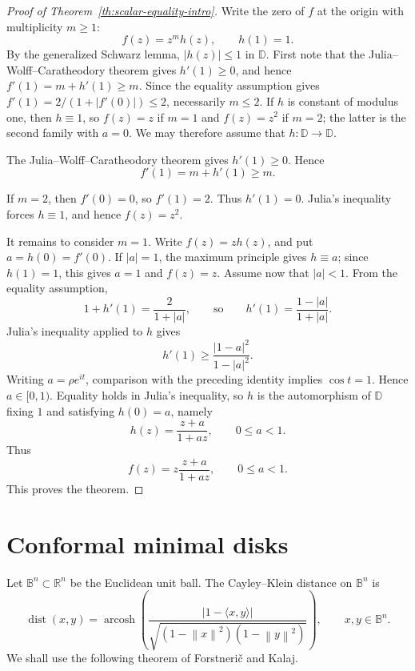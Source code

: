 \documentclass[11pt]{amsart}
\theoremstyle{definition}
\theoremstyle{remark}
\newcommand{\R}{\mathbb R}
\newcommand{\D}{\mathbb D}
\newcommand{\B}{\mathbb B}
\newcommand{\inner}[2]{\langle #1,#2\rangle}
\newcommand{\norm}[1]{\left\|#1\right\|}
\newcommand{\dist}{\operatorname{dist}}
\newcommand{\arcosh}{\operatorname{arcosh}}
\begin{document}
\begin{proof}[Proof of Theorem~\ref{th:scalar-equality-intro}]
Write the zero of \(f\) at the origin with multiplicity \(m\ge1\):
\[
        f(z)=z^m h(z),
        \qquad h(1)=1.
\]
By the generalized Schwarz lemma, \(|h(z)|\le1\) in \(\D\). First note that the Julia--Wolff--Caratheodory theorem gives \(h'(1)\ge0\), and hence \(f'(1)=m+h'(1)\ge m\). Since the equality assumption gives \(f'(1)=2/(1+|f'(0)|)\le2\), necessarily \(m\le2\). If \(h\) is constant of modulus one, then \(h\equiv1\), so \(f(z)=z\) if \(m=1\) and \(f(z)=z^2\) if \(m=2\); the latter is the second family with \(a=0\). We may therefore assume that \(h:\D\to\D\).

The Julia--Wolff--Caratheodory theorem gives \(h'(1)\ge0\). Hence
\[
        f'(1)=m+h'(1)\ge m.
\]

If \(m=2\), then \(f'(0)=0\), so \(f'(1)=2\). Thus \(h'(1)=0\). Julia's inequality forces \(h\equiv1\), and hence \(f(z)=z^2\).

It remains to consider \(m=1\). Write \(f(z)=zh(z)\), and put \(a=h(0)=f'(0)\). If \(|a|=1\), the maximum principle gives \(h\equiv a\); since \(h(1)=1\), this gives \(a=1\) and \(f(z)=z\). Assume now that \(|a|<1\). From the equality assumption,
\[
        1+h'(1)=\frac{2}{1+|a|},
        \qquad\text{so}\qquad
        h'(1)=\frac{1-|a|}{1+|a|}.
\]
Julia's inequality applied to \(h\) gives
\[
        h'(1)
        \ge
        \frac{|1-a|^2}{1-|a|^2}.
\]
Writing \(a=\rho e^{it}\), comparison with the preceding identity implies \(\cos t=1\). Hence \(a\in[0,1)\). Equality holds in Julia's inequality, so \(h\) is the automorphism of \(\D\) fixing \(1\) and satisfying \(h(0)=a\), namely
\[
        h(z)=\frac{z+a}{1+az},
        \qquad 0\le a<1.
\]
Thus
\[
        f(z)=z\frac{z+a}{1+az},
        \qquad 0\le a<1.
\]
This proves the theorem.
\end{proof}

\section{Conformal minimal disks}\label{sec:minimal}

Let \(\B^n\subset\R^n\) be the Euclidean unit ball. The Cayley--Klein distance on \(\B^n\) is
\begin{equation}\label{eq:ck-distance}
        \dist(x,y)
        =
        \arcosh\left(
        \frac{|1-\inner{x}{y}|}{\sqrt{(1-\norm{x}^2)(1-\norm{y}^2)}}
        \right),
        \qquad x,y\in\B^n.
\end{equation}
We shall use the following theorem of Forstneri\v c and Kalaj.
\end{document}
